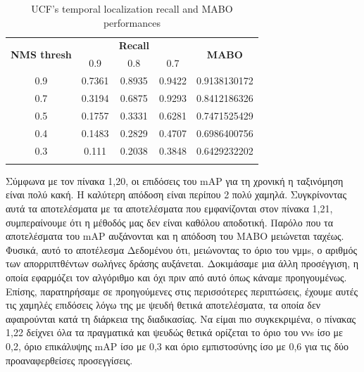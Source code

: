 \documentclass{report}
\begin{document}
\begin{center}
  \begin{longtable}{|| c || c c c | c |}
    \hline
    \multirow{2}{*}{\textbf{NMS thresh}} & {} & {\textbf{Recall}} & {} & \multirow{2}{*}{\textbf{MABO}} \\
      {} & 0.9 & 0.8 & 0.7 & {} \\
      \hline
      0.9 & 0.7361 & 0.8935 & 0.9422 & 0.9138130172 \\
      \hline
      0.7 & 0.3194 & 0.6875 & 0.9293 & 0.8412186326 \\
      \hline
      0.5 & 0.1757 & 0.3331 & 0.6281 & 0.7471525429 \\
      \hline
      0.4 &0.1483 & 0.2829 & 0.4707 & 0.6986400756 \\
      \hline
      0.3 & 0.111 & 0.2038 & 0.3848 & 0.6429232202 \\
      \hline
    \caption{UCF's temporal localization recall and MABO performances}
    \label{table:temp_cls_recall_1}
  \end{longtable}
\end{center}

Σύμφωνα με τον πίνακα 1,20, οι επιδόσεις του mAP για τη χρονική
η ταξινόμηση είναι πολύ κακή. Η καλύτερη απόδοση είναι περίπου 2%
πολύ χαμηλά. Συγκρίνοντας αυτά τα αποτελέσματα με τα αποτελέσματα που εμφανίζονται στον πίνακα 1,21, συμπεραίνουμε
ότι η μέθοδός μας δεν είναι καθόλου αποδοτική. Παρόλο που τα αποτελέσματα του mAP αυξάνονται
και η απόδοση του MABO μειώνεται ταχέως. Φυσικά, αυτό το αποτέλεσμα
Δεδομένου ότι, μειώνοντας το όριο του νμμs, ο αριθμός των απορριπτθέντων
σωλήνες δράσης αυξάνεται.
Δοκιμάσαμε μια άλλη προσέγγιση, η οποία εφαρμόζει τον αλγόριθμο
και όχι πριν από αυτό όπως κάναμε προηγουμένως. Επίσης, παρατηρήσαμε σε προηγούμενες
στις περισσότερες περιπτώσεις, έχουμε αυτές τις χαμηλές επιδόσεις λόγω της
με ψευδή θετικά αποτελέσματα, τα οποία δεν αφαιρούνται κατά τη διάρκεια της διαδικασίας. Να είμαι
πιο συγκεκριμένα, ο πίνακας 1,22 δείχνει όλα τα πραγματικά και ψευδώς θετικά
ορίζεται το όριο του ννs ίσο με 0,2, όριο επικάλυψης mAP ίσο με 0,3
και όριο εμπιστοσύνης ίσο με 0,6 για τις δύο προαναφερθείσες προσεγγίσεις.
\end{document}
